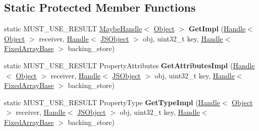 \subsection*{Static Protected Member Functions}
\begin{DoxyCompactItemize}
\item 
\hypertarget{classv8_1_1internal_1_1_typed_elements_accessor_ac33ddd737b752c8e2db719b028fc7b08}{}static M\+U\+S\+T\+\_\+\+U\+S\+E\+\_\+\+R\+E\+S\+U\+L\+T \hyperlink{classv8_1_1internal_1_1_maybe_handle}{Maybe\+Handle}$<$ \hyperlink{classv8_1_1internal_1_1_object}{Object} $>$ {\bfseries Get\+Impl} (\hyperlink{classv8_1_1internal_1_1_handle}{Handle}$<$ \hyperlink{classv8_1_1internal_1_1_object}{Object} $>$ receiver, \hyperlink{classv8_1_1internal_1_1_handle}{Handle}$<$ \hyperlink{classv8_1_1internal_1_1_j_s_object}{J\+S\+Object} $>$ obj, uint32\+\_\+t key, \hyperlink{classv8_1_1internal_1_1_handle}{Handle}$<$ \hyperlink{classv8_1_1internal_1_1_fixed_array_base}{Fixed\+Array\+Base} $>$ backing\+\_\+store)\label{classv8_1_1internal_1_1_typed_elements_accessor_ac33ddd737b752c8e2db719b028fc7b08}

\item 
\hypertarget{classv8_1_1internal_1_1_typed_elements_accessor_af3a136d2f9ed9fb5e6fb0e5df583c594}{}static M\+U\+S\+T\+\_\+\+U\+S\+E\+\_\+\+R\+E\+S\+U\+L\+T Property\+Attributes {\bfseries Get\+Attributes\+Impl} (\hyperlink{classv8_1_1internal_1_1_handle}{Handle}$<$ \hyperlink{classv8_1_1internal_1_1_object}{Object} $>$ receiver, \hyperlink{classv8_1_1internal_1_1_handle}{Handle}$<$ \hyperlink{classv8_1_1internal_1_1_j_s_object}{J\+S\+Object} $>$ obj, uint32\+\_\+t key, \hyperlink{classv8_1_1internal_1_1_handle}{Handle}$<$ \hyperlink{classv8_1_1internal_1_1_fixed_array_base}{Fixed\+Array\+Base} $>$ backing\+\_\+store)\label{classv8_1_1internal_1_1_typed_elements_accessor_af3a136d2f9ed9fb5e6fb0e5df583c594}

\item 
\hypertarget{classv8_1_1internal_1_1_typed_elements_accessor_a426210cbd9775912dabe2767d44e56b4}{}static M\+U\+S\+T\+\_\+\+U\+S\+E\+\_\+\+R\+E\+S\+U\+L\+T Property\+Type {\bfseries Get\+Type\+Impl} (\hyperlink{classv8_1_1internal_1_1_handle}{Handle}$<$ \hyperlink{classv8_1_1internal_1_1_object}{Object} $>$ receiver, \hyperlink{classv8_1_1internal_1_1_handle}{Handle}$<$ \hyperlink{classv8_1_1internal_1_1_j_s_object}{J\+S\+Object} $>$ obj, uint32\+\_\+t key, \hyperlink{classv8_1_1internal_1_1_handle}{Handle}$<$ \hyperlink{classv8_1_1internal_1_1_fixed_array_base}{Fixed\+Array\+Base} $>$ backing\+\_\+store)\label{classv8_1_1internal_1_1_typed_elements_accessor_a426210cbd9775912dabe2767d44e56b4}


\end{DoxyCompactItemize}
